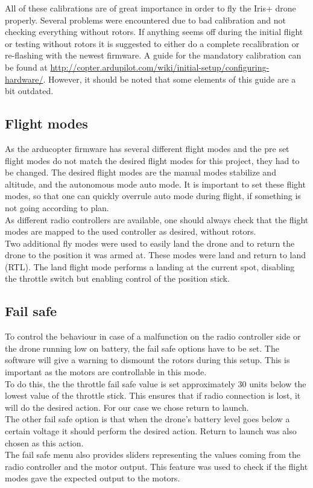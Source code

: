 All of these calibrations are of great importance in order to fly the Iris+ drone properly. Several
problems were encountered due to bad calibration and not checking everything without rotors. If
anything seems off during the initial flight or testing without rotors it is suggested to either do
a complete recalibration or re-flashing with the newest firmware. A guide for the mandatory
calibration can be found at
\url{http://copter.ardupilot.com/wiki/initial-setup/configuring-hardware/}.
However, it should be noted that some elements of this guide are a bit outdated.

\subsection*{Flight modes}
As the arducopter firmware has several different flight modes and the pre set flight modes do not
match the desired flight modes for this project, they had to be changed.
The desired flight modes
are the manual modes stabilize and altitude,
and the autonomous mode auto mode.
It is important
to set these flight modes, so that one can quickly overrule auto mode during flight,
if something is not going according to plan.\\
As different radio controllers are available, one should always check that the flight modes are
mapped to the used controller as desired, without rotors.\\
Two additional fly modes were used to easily land the drone and to return the drone to the position
it was armed at. These modes were land and return to land (RTL). The land flight mode performs a
landing at the current spot, disabling the throttle switch but enabling control of the position
stick.

\subsection*{Fail safe}
To control the behaviour in case of a malfunction on the radio controller side or the drone running
low on battery, the fail safe options have to be set. The software will give a warning to dismount
the rotors during this setup. This is important as the motors are controllable in this mode.\\
To do this, the the throttle fail safe value is set approximately 30 units below the lowest value of the
throttle stick. This ensures that if radio connection is lost, it will do the desired action. For
our case we chose return to launch.\\
The other fail safe option is that when the drone's battery level goes below a certain voltage it should
perform the desired action. Return to launch was also chosen as this action.\\
The fail safe menu also provides sliders representing the values coming from the radio controller
and the motor output. This feature was used to check if the flight modes gave the expected output
to the motors.

